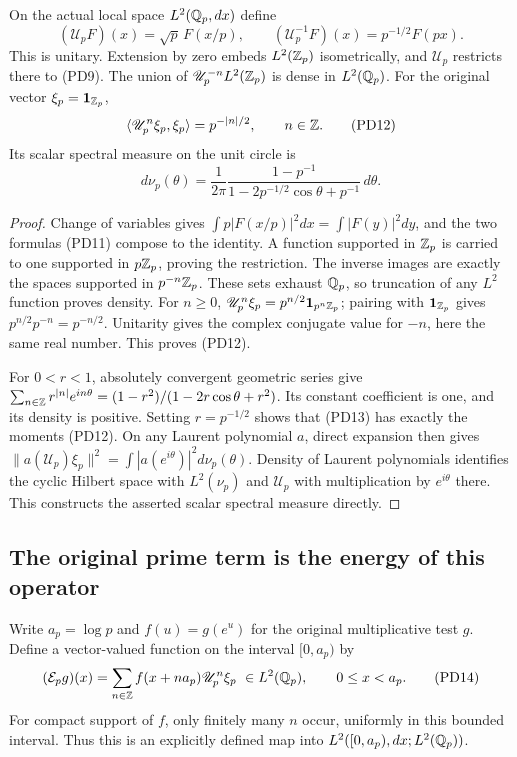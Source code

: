 \begin{theorem}
\label{thm:PD-dilation}
On the actual local space $L^2(\mathbb Q_p,dx)$ define
\[
 (\mathscr U_pF)(x)=\sqrt p\,F(x/p),\qquad
 (\mathscr U_p^{-1}F)(x)=p^{-1/2}F(px).
 \tag{PD11}
\]
This is unitary. Extension by zero embeds $L^2(\mathbb Z_p)$ isometrically,
and $\mathscr U_p$ restricts there to (PD9). The union of
$\mathscr U_p^{-n}L^2(\mathbb Z_p)$ is dense in $L^2(\mathbb Q_p)$.
For the original vector $\xi_p=\mathbf1_{\mathbb Z_p}$,
\[
 \langle \mathscr U_p^n\xi_p,\xi_p\rangle=p^{-|n|/2},\qquad n\in\mathbb Z.
 \tag{PD12}\label{eq:PD-moments}
\]
Its scalar spectral measure on the unit circle is
\[
 d\nu_p(\theta)=\frac1{2\pi}
 \frac{1-p^{-1}}{1-2p^{-1/2}\cos\theta+p^{-1}}\,d\theta.
 \tag{PD13}\label{eq:PD-measure}
\]
\end{theorem}
\begin{proof}
Change of variables gives
$\int p|F(x/p)|^2dx=\int|F(y)|^2dy$, and the two formulas (PD11)
compose to the identity. A function supported in $\mathbb Z_p$ is carried
to one supported in $p\mathbb Z_p$, proving the restriction. The inverse
images are exactly the spaces supported in $p^{-n}\mathbb Z_p$. These sets
exhaust $\mathbb Q_p$, so truncation of any $L^2$ function proves density.
For $n\ge0$,
$\mathscr U_p^n\xi_p=p^{n/2}\mathbf1_{p^n\mathbb Z_p}$; pairing with
$\mathbf1_{\mathbb Z_p}$ gives $p^{n/2}p^{-n}=p^{-n/2}$.
Unitarity gives the complex conjugate value for $-n$, here the same real
number. This proves (PD12).

For $0<r<1$, absolutely convergent geometric series give
$\sum_{n\in\mathbb Z}r^{|n|}e^{in\theta}
=(1-r^2)/(1-2r\cos\theta+r^2)$. Its constant coefficient is one,
and its density is positive. Setting $r=p^{-1/2}$ shows that (PD13)
has exactly the moments (PD12). On any Laurent polynomial $a$, direct
expansion then gives
$\|a(\mathscr U_p)\xi_p\|^2=\int|a(e^{i\theta})|^2d\nu_p(\theta)$.
Density of Laurent polynomials identifies the cyclic Hilbert space with
$L^2(\nu_p)$ and $\mathscr U_p$ with multiplication by $e^{i\theta}$ there.
This constructs the asserted scalar spectral measure directly.
\end{proof}

\subsection{The original prime term is the energy of this operator}
Write $a_p=\log p$ and
$f(u)=g(e^u)$ for the original multiplicative test $g$.
Define a vector-valued function on the interval $[0,a_p)$ by
\[
 (\mathcal E_pg)(x)=
 \sum_{n\in\mathbb Z} f(x+n a_p)\mathscr U_p^n\xi_p
 \ \in L^2(\mathbb Q_p),\qquad 0\le x<a_p.
 \tag{PD14}\label{eq:PD-energy-map}
\]
For compact support of $f$, only finitely many $n$ occur, uniformly in
this bounded interval. Thus this is an explicitly defined map into
$L^2([0,a_p),dx;L^2(\mathbb Q_p))$.

